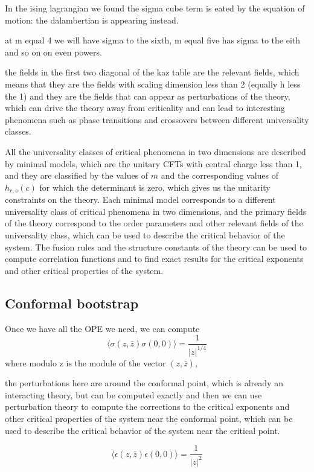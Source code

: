 In the ising lagrangian we found the sigma cube term is eated by the equation of motion: the dalambertian is appearing instead.

at m equal 4 we will have sigma to the sixth, m equal five has sigma to the eith and so on on even powers.

the fields in the first two diagonal of the kaz table are the relevant fields, which means that they are the fields with scaling dimension less than 2 (equally h less the 1) and they are the fields that can appear as perturbations of the theory, which can drive the theory away from criticality and can lead to interesting phenomena such as phase transitions and crossovers between different universality classes.

All the universality classes of critical phenomena in two dimensions are described by minimal models, which are the unitary CFTs with central charge less than 1, and they are classified by the values of \(m\) and the corresponding values of \(h_{r,s}(c)\) for which the determinant is zero, which gives us the unitarity constraints on the theory. Each minimal model corresponds to a different universality class of critical phenomena in two dimensions, and the primary fields of the theory correspond to the order parameters and other relevant fields of the universality class, which can be used to describe the critical behavior of the system. The fusion rules and the structure constants of the theory can be used to compute correlation functions and to find exact results for the critical exponents and other critical properties of the system.

\subsection{Conformal bootstrap}

Once we have all the OPE we need, we can compute
\[
    \langle \sigma(z, \bar{z}) \sigma(0, 0) \rangle = \frac{1}{|z|^{1/4}}
\]
where modulo z is the module of the vector \((z, \bar{z})\),

the perturbations here are around the conformal point, which is already an interacting theory, but can be computed exactly and then we can use perturbation theory to compute the corrections to the critical exponents and other critical properties of the system near the conformal point, which can be used to describe the critical behavior of the system near the critical point.

\[
    \langle \epsilon(z, \bar{z}) \epsilon(0, 0) \rangle = \frac{1}{|z|^{2}}
\]

